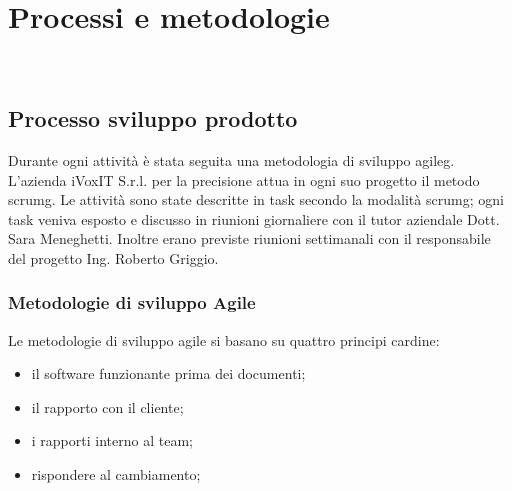 
\chapter{Processi e metodologie}
\label{cap:processi-metodologie}

\\

\section{Processo sviluppo prodotto}
Durante ogni attività è stata seguita una metodologia di sviluppo \gls{agileg}. L'azienda iVoxIT S.r.l. per la precisione attua in ogni suo progetto il metodo \gls{scrumg}. Le attività sono state descritte in task secondo la modalità \gls{scrumg}; ogni task veniva esposto e discusso in riunioni giornaliere con il tutor aziendale Dott. Sara Meneghetti. Inoltre erano previste riunioni settimanali con il responsabile del progetto Ing. Roberto Griggio.

\subsection{Metodologie di sviluppo Agile}
Le metodologie di sviluppo agile si basano su quattro principi cardine:
\begin{itemize}
    \item il software funzionante prima dei documenti;
    \item il rapporto con il cliente;
    \item i rapporti interno al team;
    \item rispondere al cambiamento;
\end{itemize}


